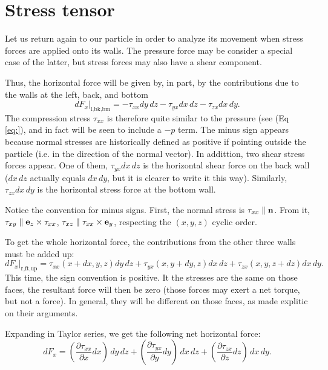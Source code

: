 \section{Stress tensor}

Let us return again to our particle in order to analyze its movement
when stress forces are applied onto its walls. The pressure force may
be consider a special case of the latter, but stress forces may also
have a shear component.

Thus, the horizontal force will be given by, in part, by the
contributions due to the walls at the left, back, and bottom
\[
\left. dF_x \right|_\text{l,bk,bm} =
-  \tau_{xx} dy\, dz
-  \tau_{yx} dx\, dz
-  \tau_{zx} dx\, dy .
\]
The compression stress $\tau_{xx}$ is therefore quite similar to the
pressure (see (Eq \ref{eq:}), and in fact will be seen to include a
$-p$ term. The minus sign appears because normal stresses are
historically defined as positive if pointing outside the particle
(i.e. in the direction of the normal vector).
%
In addittion, two shear stress forces appear. One of them, $\tau_{yx}
dx\, dz$ is the horizontal shear force on the back wall ($dx\, dz$
actually equals $dx\, dy$, but it is clearer to write it this
way). Similarly, $\tau_{zx} dx\, dy $ is the horizontal stress force
at the bottom wall.

Notice the convention for minus signs. First, the normal stress is
$\tau_{xx} \parallel \mathbf{n} $. From it, $\tau_{xy} \parallel
\mathbf{e}_z\times \tau_{xx} $, $\tau_{xz} \parallel \tau_{xx} \times \mathbf{e}_y
$, respecting the $(x,y,z)$ cyclic order.

To get the whole horizontal force, the contributions from the other
three walls must be added up:
\[
\left. dF_x \right|_\text{r,ft,up} =
  \tau_{xx}(x+dx,y   ,z   )  dy\, dz +
  \tau_{yx}(x   ,y+dy,z   )  dx\, dz +
  \tau_{zx}(x   ,y   ,z+dz)  dx\, dy .
\]
This time, the sign convention is positive. It the stresses are the
same on those faces, the resultant force will then be zero (those
forces may exert a net torque, but not a force). In general, they will
be different on those faces, as made explitic on their arguments.

Expanding in Taylor series, we get the following net horizontal force:
\[
 dF_x  =
 \left(\frac{\partial\tau_{xx}}{\partial x}  dx\right)\, dy\, dz
+\left(\frac{\partial\tau_{yx}}{\partial y}  dy\right)\, dx\, dz
+\left(\frac{\partial\tau_{zx}}{\partial z}  dz\right)\, dx\, dy .
\]

